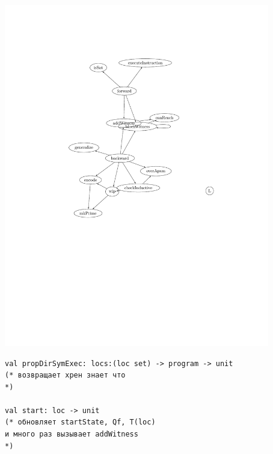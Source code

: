 \documentclass[aspectratio=169
  , xcolor={svgnames}
  , hyperref={ colorlinks,citecolor=Blue
             , linkcolor=DarkRed,urlcolor=DarkBlue}
  , usenames, dvipsnames
  , russian
  ]{beamer}
\begin{document}
\begin{frame}
\centering
\includegraphics[height=15cm]{graph.pdf}
\end{frame}

\begin{frame}[fragile]
\begin{verbatim}
val propDirSymExec: locs:(loc set) -> program -> unit
(* возвращает хрен знает что
*)

val start: loc -> unit 
(* обновляет startState, Qf, T(loc) 
и много раз вызывает addWitness
*)
\end{verbatim}
\end{frame}
\end{document}

